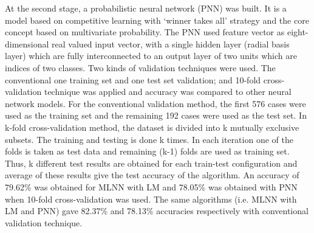 At the second stage, a probabilistic neural network (PNN) was built. It is a model based on competitive learning with ‘winner takes all’ strategy and the core concept based on multivariate probability. The PNN used feature vector as eight-dimensional real valued input vector, with a single hidden layer (radial basis layer) which are fully interconnected to an output layer of two units which are indices of two classes.
Two kinds of validation techniques were used. The conventional one training set and one test set validation; and 10-fold cross-validation technique was applied and accuracy was compared to other neural network models. For the conventional validation method, the first 576 cases were used as the training set and the remaining 192 cases were used as the test set. In k-fold cross-validation method, the dataset is divided into k mutually exclusive subsets. The training and testing is done k times. In each iteration one of the folds is taken as test data and remaining (k-1) folds are used as training set. Thus, k different test results are obtained for each train-test configuration and average of these results give the test accuracy of the algorithm.
An accuracy of 79.62\% was obtained for MLNN with LM and 78.05\% was obtained with PNN when 10-fold cross-validation was used. The same algorithms (i.e. MLNN with LM and PNN) gave 82.37\% and 78.13\% accuracies respectively with conventional validation technique.

